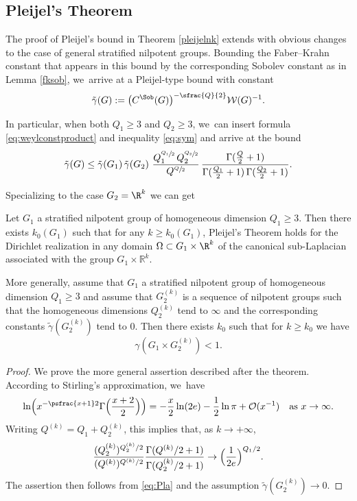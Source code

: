 \subsection{Pleijel's Theorem}
The proof of Pleijel's bound in Theorem \ref{pleijelnk} extends with obvious changes to the case of general stratified nilpotent groups. Bounding the Faber--Krahn constant that appears in this bound by the corresponding Sobolev constant as in Lemma \ref{fksob}, we~arrive at a Pleijel-type bound with constant
\[
\tilde\gamma (G) := \bigl(C^\Sob(G)\bigr)^{-\sfrac{Q}{2}}\mathcal W(G)^{-1}.
\]

In particular, when both $Q_1\geq 3$ and $Q_2\geq 3$, we~can insert formula \eqref{eq:weylconstproduct} and inequality \eqref{eq:sym} and arrive at the bound
\begin{align}\label{eq:Pla}
\tilde\gamma (G) \leq \tilde\gamma (G_1) \,\tilde\gamma (G_2) \ \frac{Q_1^{\sfrac{Q_1}2}\,Q_2^{\sfrac{Q_2}2}}{Q^{\sfrac Q2}} \,
\frac{\Gamma (\frac Q2+1)}{\Gamma(\frac{Q_1}2 +1) \,\Gamma(\frac{Q_2}2 +1)}.
\end{align}

Specializing to the case $G_2=\R^k$ we can get

\begin{theorem}
Let $G_1$ a stratified nilpotent group of homogeneous dimension \hbox{$Q_1\geq3$}. Then there exists $k_0(G_1)$ such that for any $k\geq k_0(G_1)$, Pleijel's Theorem holds for the Dirichlet realization in any domain $\Omega\subset G_1\times\R^k$ of the canonical sub-Laplacian associated with the group $G_1 \times \mathbb R^k$.
\end{theorem}

More generally, assume that $G_1$ a stratified nilpotent group of homogeneous dimension $Q_1\geq 3$ and assume that $G_2^{(k)}$ is a sequence of nilpotent groups such that the homogeneous dimensions $Q_2^{(k)}$ tend to $\infty$ and the corresponding constants $\tilde\gamma(G_2^{(k)})$ tend to $0$. Then there exists $k_0$ such that for $k\geq k_0$ we have
\[
\gamma(G_1 \times G_2^{(k)}) <1.
\]

\begin{proof}
We prove the more general assertion described after the theorem. According to Stirling's approximation, we~have
\begin{equation}\label{eq:Stir}
\ln \Bigl(x^{-\psfrac{x+1}2} \Gamma\Bigl(\frac{x+2}2\Bigr) \Bigr) = - \frac x2 \ln(2e) - \frac12 \ln \pi + \mathcal O(x^{-1})
\quad\text{as}\ x\to\infty.
\end{equation}
Writing $Q^{(k)} = Q_1 + Q_2^{(k)}$, this implies that, as $k\to +\infty$,
\[
\frac{(Q_2^{(k)})^{Q_2^{(k)}/2}}{(Q^{(k)})^{Q^{(k)}/2}} \frac{\Gamma (Q^{(k)}/2+1)}{\Gamma(Q_2^{(k)}/2 +1)}\to \Bigl(\frac{1}{2e}\Bigr)^{Q_1/2}.
\]
The assertion then follows from \eqref{eq:Pla} and the assumption $\tilde\gamma(G_2^{(k)})\to 0$.
\end{proof}

